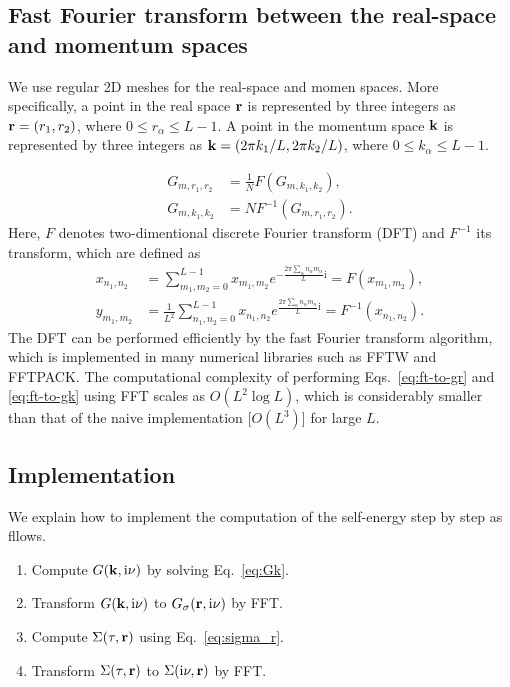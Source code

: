 \documentclass[submission, LectureNotes]{SciPost}
\newcommand{\bk}{\ensuremath{{\bf k}}}
\newcommand{\br}{\ensuremath{{\bf r}}}
\newcommand\ii{\mathrm{i}}%
\newcommand\iv{\ii\nu}%
\begin{document}
\subsection{Fast Fourier transform between the real-space and momentum spaces}
We use regular 2D meshes for the real-space and momen spaces.
More specifically, a point in the real space $\br$ is represented by three integers as
$\br=(r_1, r_2)$, where $0 \le r_\alpha \le L-1$.
A point in the momentum space $\bk$ is represented by three integers as
$\bk=(2\pi k_1/L, 2\pi k_2/L)$, where $0 \le k_\alpha \le L-1$.

\begin{align}
    G_{m,r_1, r_2} &= \frac{1}{N} F(G_{m, k_1, k_2}),\\
    G_{m,k_1, k_2} &= N F^{-1}(G_{m, r_1, r_2}).
\end{align}
Here, $F$ denotes two-dimentional discrete Fourier transform (DFT) and $F^{-1}$ its transform,
which are defined as
\begin{align}
    x_{n_1, n_2} &= \sum_{m_1,m_2=0}^{L-1} x_{m_1,m_2} e^{-\frac{2\pi \sum_\alpha n_\alpha m_\alpha}{L}\ii}= F(x_{m_1, m_2}),\\
    y_{m_1, m_2} &= \frac{1}{L^2} \sum_{n_1,n_2=0}^{L-1} x_{n_1,n_2} e^{\frac{2\pi \sum_\alpha n_\alpha m_\alpha}{L}\ii} = F^{-1}(x_{n_1, n_2}).
\end{align}
The DFT can be performed efficiently by the fast Fourier transform algorithm,
which is implemented in many numerical libraries such as FFTW and FFTPACK.
The computational complexity of performing Eqs.~\eqref{eq:ft-to-gr} and \eqref{eq:ft-to-gk} using FFT
scales as $O(L^2 \log L)$,
which is considerably smaller than that of the naive implementation [$O(L^3)$] for large $L$.

\subsection{Implementation}
We explain how to implement the computation of the self-energy step by step as fllows.
\begin{enumerate}
    \item Compute $G(\bk, \iv)$ by solving Eq.~\eqref{eq:Gk}.
    \item Transform $G(\bk, \iv)$ to $G_\sigma(\br, \iv)$ by FFT.
    \item Compute $\Sigma(\tau, \br)$ using Eq.~\eqref{eq:sigma_r}.
    \item Transform $\Sigma(\tau, \br)$ to $\Sigma(\iv, \br)$ by FFT.
\end{enumerate}
\end{document}
